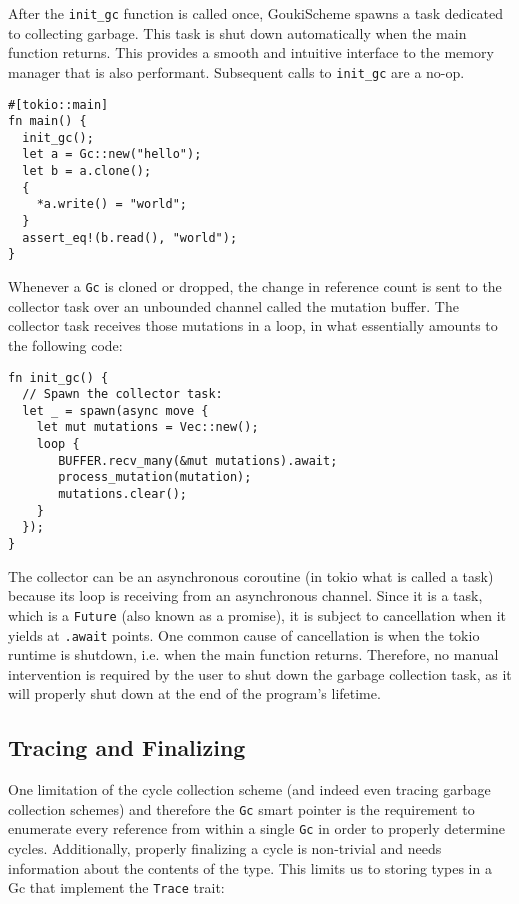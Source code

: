 \documentclass[sigplan,review,anonymous]{acmart}
\begin{document}
After the \texttt{init\_gc} function is called once, GoukiScheme spawns a task
dedicated to collecting garbage. This task is shut down automatically when the
main function returns. This provides a smooth and intuitive interface to the
memory manager that is also performant. Subsequent calls to \texttt{init\_gc}
are a no-op.

\begin{verbatim}
#[tokio::main]
fn main() {
  init_gc();
  let a = Gc::new("hello");
  let b = a.clone();
  {
    *a.write() = "world";
  }
  assert_eq!(b.read(), "world");
}
\end{verbatim}

Whenever a \texttt{Gc} is cloned or dropped, the change in reference count is
sent to the collector task over an unbounded channel called the mutation buffer.
The collector task receives those mutations in a loop, in what essentially amounts
to the following code:

\begin{verbatim}
fn init_gc() {
  // Spawn the collector task:
  let _ = spawn(async move {
    let mut mutations = Vec::new();
    loop {
       BUFFER.recv_many(&mut mutations).await;
       process_mutation(mutation);
       mutations.clear();
    } 
  });
}  
\end{verbatim}

The collector can be an asynchronous coroutine (in tokio what is called a task)
because its loop is receiving from an asynchronous channel. Since it is a task,
which is a \texttt{Future} (also known as a promise), it is subject to
cancellation\cite{cancellation} when it yields at \texttt{.await} points.
One common cause of cancellation is when the tokio runtime is shutdown,
i.e. when the main function returns. Therefore, no manual intervention is
required by the user to shut down the garbage collection task, as it will
properly shut down at the end of the program's lifetime.

\subsection{Tracing and Finalizing}

One limitation of the cycle collection scheme (and indeed even tracing garbage
collection schemes) and therefore the \texttt{Gc} smart pointer is the
requirement to enumerate every reference from within a single \texttt{Gc} in
order to properly determine cycles. Additionally, properly finalizing a cycle is
non-trivial and needs information about the contents of the type. This limits us
to storing types in a Gc that implement the \texttt{Trace} trait:
\end{document}
